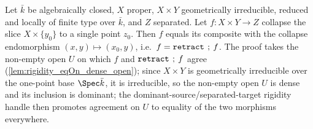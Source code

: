 \begin{lemma}
  \label{lem:rigidity_core}
  Let \(\bar k\) be algebraically closed, \(X\) proper, \(X \times Y\) geometrically irreducible,
  reduced and locally of finite type over \(\bar k\), and \(Z\) separated. Let
  \(f \colon X \times Y \to Z\) collapse the slice \(X \times \{y_0\}\) to a single point \(z_0\).
  Then \(f\) equals its composite with the collapse endomorphism \((x, y) \mapsto (x_0, y)\), i.e.\
  \(f = \mathtt{retract} \fatsemi f\). The proof takes the non-empty open \(U\) on which \(f\) and
  \(\mathtt{retract} \fatsemi f\) agree (\cref{lem:rigidity_eqOn_dense_open}); since \(X \times Y\)
  is geometrically irreducible over the one-point base \(\Spec \bar k\), it is irreducible, so the
  non-empty open \(U\) is dense and its inclusion is dominant; the dominant-source/separated-target
  rigidity handle then promotes agreement on \(U\) to equality of the two morphisms everywhere.
\end{lemma}

